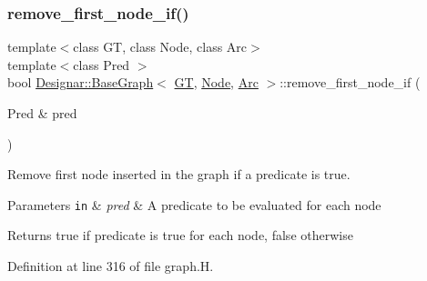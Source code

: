 \subsubsection{\texorpdfstring{remove\+\_\+first\+\_\+node\+\_\+if()}{remove\_first\_node\_if()}\hspace{0.1cm}{\footnotesize\ttfamily [1/2]}}
{\footnotesize\ttfamily template$<$class GT, class Node, class Arc$>$ \\
template$<$class Pred $>$ \\
bool \hyperlink{class_designar_1_1_base_graph}{Designar\+::\+Base\+Graph}$<$ \hyperlink{demo-buildgraph_8_c_a3001c40d2c31ca87ed96cd7d1334a55e}{GT}, \hyperlink{namespace_designar_a5af326c65aa2bd26b26c410f2030d09e}{Node}, \hyperlink{namespace_designar_a3f55fb5513d62ff47cbc8f72b8e95d6f}{Arc} $>$\+::remove\+\_\+first\+\_\+node\+\_\+if (\begin{DoxyParamCaption}\item[{Pred \&}]{pred }\end{DoxyParamCaption})\hspace{0.3cm}{\ttfamily [inline]}}



Remove first node inserted in the graph if a predicate is true. 


\begin{DoxyParams}[1]{Parameters}
\mbox{\tt in}  & {\em pred} & A predicate to be evaluated for each node \\
\hline
\end{DoxyParams}
\begin{DoxyReturn}{Returns}
{\ttfamily true} if predicate is true for each node, {\ttfamily false} otherwise 
\end{DoxyReturn}


Definition at line 316 of file graph.\+H.

\mbox{\label{class_designar_1_1_base_graph_aec049416b5240910cb04b1d6f55fcecf}} 
